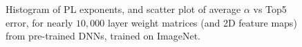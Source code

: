 \begin{figure}[H]
   \centering
   \quad
   \caption{Histogram of PL exponents, and scatter plot of average ${\alpha}$ vs Top5 error, for nearly $10,000$ layer weight matrices (and 2D feature maps) from pre-trained DNNs, trained on ImageNet.
   }
   \label{fig:alphas}
\end{figure}

